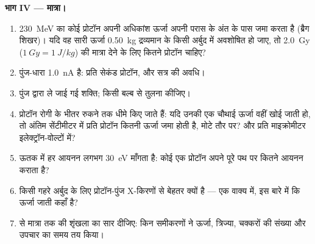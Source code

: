 \begin{problem}
\medskip
\noindent\textbf{भाग IV --- मात्रा।}
\begin{enumerate}[resume]
  \item \qty{230}{MeV} का कोई प्रोटॉन अपनी अधिकांश ऊर्जा अपनी परास के अंत
        के पास जमा करता है (ब्रैग शिखर)। यदि वह सारी ऊर्जा \qty{0.50}{kg}
        द्रव्यमान के किसी अर्बुद में अवशोषित हो जाए, तो \qty{2.0}{Gy}
        ($\qty{1}{Gy} = \qty{1}{J/kg}$) की मात्रा देने के लिए कितने
        प्रोटॉन चाहिए?
  \item पुंज-धारा \qty{1.0}{nA} है: प्रति सेकंड प्रोटॉन, और सत्र की अवधि।
  \item पुंज द्वारा ले जाई गई शक्ति; किसी बल्ब से तुलना कीजिए।
  \item प्रोटॉन रोगी के भीतर रुकने तक धीमे किए जाते हैं: यदि उनकी एक
        चौथाई ऊर्जा वहीं खोई जाती हो, तो अंतिम सेंटीमीटर में प्रति प्रोटॉन
        कितनी ऊर्जा जमा होती है, मोटे तौर पर? और प्रति माइक्रोमीटर
        इलेक्ट्रॉन-वोल्टों में?
  \item ऊतक में हर आयनन लगभग \qty{30}{eV} माँगता है: कोई एक प्रोटॉन अपने
        पूरे पथ पर कितने आयनन कराता है?
  \item किसी गहरे अर्बुद के लिए प्रोटॉन-पुंज X-किरणों से बेहतर क्यों है ---
        एक वाक्य में, इस बारे में कि ऊर्जा जाती कहाँ है?
  \item {} से मात्रा तक की शृंखला का सार दीजिए: किन समीकरणों ने
        ऊर्जा, त्रिज्या, चक्करों की संख्या और उपचार का समय तय किया।
\end{enumerate}
\end{problem}
